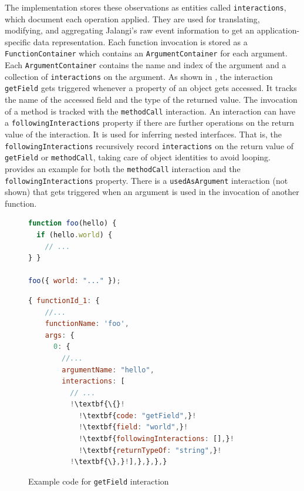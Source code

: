 \documentclass[sigconf]{acmart}
\begin{document}
The implementation stores these observations as entities called
\texttt{interactions}, which document each operation applied. They are used for translating, modifying, and
aggregating Jalangi's raw event information to get an application-specific data representation. Each function invocation is stored as
a \texttt{FunctionContainer} which contains an \texttt{ArgumentContainer} for each argument. Each \texttt{ArgumentContainer} contains 
the name and index of the argument and a collection of
\texttt{interactions} on the argument. As shown in , the interaction \texttt{getField} gets triggered whenever 
a property of an object gets accessed. It tracks the name of the
accessed field and the type of the returned value. The invocation of a
method is tracked with the \texttt{methodCall} interaction. An
interaction can have a \texttt{followingInteractions} property if
there are further operations on the return value of the interaction. It is used for inferring nested interfaces.
That is, the \texttt{followingInteractions} recursively record \texttt{interactions} on the return value of \texttt{getField} or 
\texttt{methodCall}, taking care of object identities to avoid
looping.  provides an
example for both the \texttt{methodCall} interaction 
and the \texttt{followingInteractions} property. There is a
\texttt{usedAsArgument} interaction (not shown) that
gets triggered when an argument is used in the invocation of another function.

\begin{figure}[t]
  \centering
    \begin{lstlisting}[language=JavaScript,numbers=none]
function foo(hello) {
  if (hello.world) {
    // ...
} }

foo({ world: "..." });
    \end{lstlisting}
    \begin{lstlisting}[language=JavaScript,numbers=none,escapechar=!]
{ functionId_1: {
    //...
    functionName: 'foo',
    args: {
      0: {
        //...
        argumentName: "hello",
        interactions: [
          // ...
          !\textbf{\{}!
            !\textbf{code: "getField",}!
            !\textbf{field: "world",}!
            !\textbf{followingInteractions: [],}!
            !\textbf{returnTypeOf: "string",}!
          !\textbf{\},}!],},},},}
    \end{lstlisting}
  \caption{
      Example code for \texttt{getField} interaction
    }
  \label{fig:example-get-field-interaction}
\end{figure}
\end{document}
